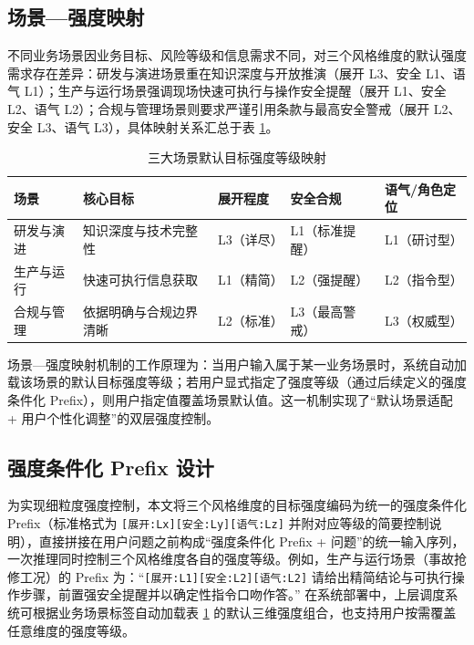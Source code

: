 \documentclass[fontset=fandol,type=master,campus=shenzhen,etitleauto=true]{hithesisbook}
\begin{document}
\subsection{场景---强度映射}\label{ux573aux666fux5f3aux5ea6ux6620ux5c04}

不同业务场景因业务目标、风险等级和信息需求不同，对三个风格维度的默认强度需求存在差异：研发与演进场景重在知识深度与开放推演（展开 L3、安全 L1、语气 L1）；生产与运行场景强调现场快速可执行与操作安全提醒（展开 L1、安全 L2、语气 L2）；合规与管理场景则要求严谨引用条款与最高安全警戒（展开 L2、安全 L3、语气 L3），具体映射关系汇总于表 \ref{tab:scene-intensity-map}。

\begin{table}[htbp]
\centering
\caption{三大场景默认目标强度等级映射}
\label{tab:scene-intensity-map}
\small
\renewcommand{\arraystretch}{1.1}
\begin{tabular}{p{2.2cm}p{3.0cm}p{1.6cm}p{2.4cm}p{2.6cm}}
\toprule
\textbf{场景} & \textbf{核心目标} & \textbf{展开程度} & \textbf{安全合规} & \textbf{语气/角色定位} \\
\midrule
研发与演进 & 知识深度与技术完整性 & L3（详尽） & L1（标准提醒） & L1（研讨型） \\
生产与运行 & 快速可执行信息获取 & L1（精简） & L2（强提醒） & L2（指令型） \\
合规与管理 & 依据明确与合规边界清晰 & L2（标准） & L3（最高警戒） & L3（权威型） \\
\bottomrule
\end{tabular}
\end{table}

场景---强度映射机制的工作原理为：当用户输入属于某一业务场景时，系统自动加载该场景的默认目标强度等级；若用户显式指定了强度等级（通过后续定义的强度条件化 Prefix），则用户指定值覆盖场景默认值。这一机制实现了``默认场景适配 + 用户个性化调整''的双层强度控制。

\subsection{强度条件化 Prefix 设计}\label{ux5f3aux5ea6ux6761ux4ef6ux5316-prefix-ux8bbeux8ba1}

为实现细粒度强度控制，本文将三个风格维度的目标强度编码为统一的强度条件化 Prefix（标准格式为 \texttt{[展开:Lx][安全:Ly][语气:Lz]} 并附对应等级的简要控制说明），直接拼接在用户问题之前构成``强度条件化 Prefix + 问题''的统一输入序列，一次推理同时控制三个风格维度各自的强度等级。例如，生产与运行场景（事故抢修工况）的 Prefix 为：``\texttt{[展开:L1][安全:L2][语气:L2]} 请给出精简结论与可执行操作步骤，前置强安全提醒并以确定性指令口吻作答。'' 在系统部署中，上层调度系统可根据业务场景标签自动加载表 \ref{tab:scene-intensity-map} 的默认三维强度组合，也支持用户按需覆盖任意维度的强度等级。
\end{document}
